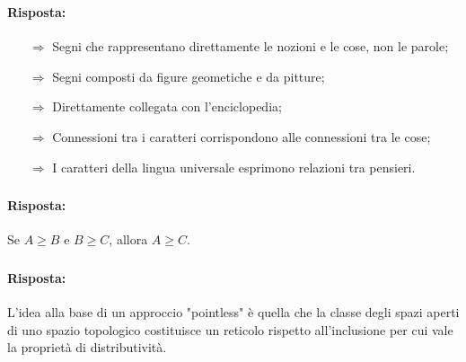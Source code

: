 \subsubsection{}


\paragraph{Risposta:}

\begin{itemize}
    \item [$\Rightarrow$] Segni che rappresentano direttamente le nozioni e le cose, non le parole;
    \item [$\Rightarrow$] Segni composti da figure geometiche e da pitture;
    \item [$\Rightarrow$] Direttamente collegata con l'enciclopedia;
    \item [$\Rightarrow$] Connessioni tra i caratteri corrispondono alle connessioni tra le cose;
    \item [$\Rightarrow$] I caratteri della lingua universale esprimono relazioni tra pensieri.
\end{itemize}

\subsubsection{}


\paragraph{Risposta:} Se $A \geq B$ e $B \geq C$, allora $A \geq C$.

\subsubsection{}


\paragraph{Risposta:} L'idea alla base di un approccio "pointless" è quella che la classe
degli spazi aperti di uno spazio topologico costituisce un reticolo rispetto all'inclusione
per cui vale la proprietà di distributività.

